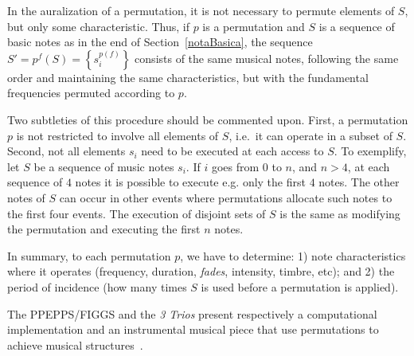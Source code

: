 \documentclass[format=acmsmall, review=false, screen=true]{acmart}
\begin{document}
In the auralization of a permutation, it is not necessary to permute elements of $S$,
but only some characteristic. Thus, if $p$ is a permutation and $S$ is a sequence of basic notes as in the end of Section~\ref{notaBasica}, the
sequence $S'=p^f(S)=\left\{s_i^{p(f)}\right\}$ consists of the same
musical notes, following the same order and maintaining the same characteristics, but with the
fundamental frequencies permuted according to $p$.

Two subtleties of this procedure should be commented upon. 
First, a permutation $p$ is not restricted to involve all elements of $S$, i.e.\ it can operate in a subset of $S$.
Second, not all elements $s_i$ need to be executed at each access to $S$.
To exemplify, let $S$ be a sequence of music notes $s_i$. 
If $i$ goes from $0$ to $n$, and
$n>4$, at each sequence of $4$ notes it is possible to execute e.g. only the first $4$
notes.
The other notes of $S$ can occur in other events where permutations 
allocate such notes to the first four events.
The execution of disjoint sets of $S$
is the same as modifying the permutation and executing the first $n$ notes.

In summary, to each permutation $p$, we have to determine:
1) note characteristics where it operates (frequency, duration, \emph{fades},
intensity, timbre, etc); and
2) the period of incidence (how many times $S$ is used before a permutation is
applied).

The PPEPPS/FIGGS and the \emph{3 Trios} present respectively a computational implementation
and an instrumental musical piece that use
permutations to achieve
musical structures~\cite{MASSA,figgusOriginal,figgusEspacializacao,figgus,3Trios}.
\end{document}
